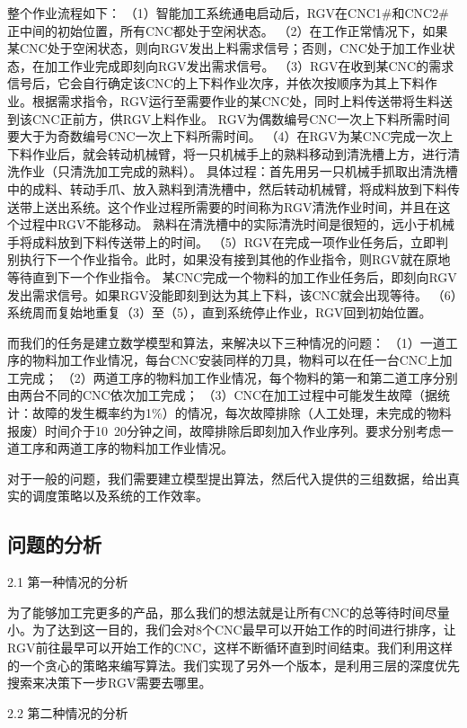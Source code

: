 \documentclass{cumcmthesis}
\begin{document}
整个作业流程如下：
（1）智能加工系统通电启动后，RGV在CNC1\#和CNC2\#正中间的初始位置，所有CNC都处于空闲状态。
（2）在工作正常情况下，如果某CNC处于空闲状态，则向RGV发出上料需求信号；否则，CNC处于加工作业状态，在加工作业完成即刻向RGV发出需求信号。
（3）RGV在收到某CNC的需求信号后，它会自行确定该CNC的上下料作业次序，并依次按顺序为其上下料作业。根据需求指令，RGV运行至需要作业的某CNC处，同时上料传送带将生料送到该CNC正前方，供RGV上料作业。
RGV为偶数编号CNC一次上下料所需时间要大于为奇数编号CNC一次上下料所需时间。
（4）在RGV为某CNC完成一次上下料作业后，就会转动机械臂，将一只机械手上的熟料移动到清洗槽上方，进行清洗作业（只清洗加工完成的熟料）。
具体过程：首先用另一只机械手抓取出清洗槽中的成料、转动手爪、放入熟料到清洗槽中，然后转动机械臂，将成料放到下料传送带上送出系统。这个作业过程所需要的时间称为RGV清洗作业时间，并且在这个过程中RGV不能移动。
熟料在清洗槽中的实际清洗时间是很短的，远小于机械手将成料放到下料传送带上的时间。
（5）RGV在完成一项作业任务后，立即判别执行下一个作业指令。此时，如果没有接到其他的作业指令，则RGV就在原地等待直到下一个作业指令。
某CNC完成一个物料的加工作业任务后，即刻向RGV发出需求信号。如果RGV没能即刻到达为其上下料，该CNC就会出现等待。
（6）系统周而复始地重复（3）至（5），直到系统停止作业，RGV回到初始位置。

而我们的任务是建立数学模型和算法，来解决以下三种情况的问题：
（1）一道工序的物料加工作业情况，每台CNC安装同样的刀具，物料可以在任一台CNC上加工完成；
（2）两道工序的物料加工作业情况，每个物料的第一和第二道工序分别由两台不同的CNC依次加工完成；
（3）CNC在加工过程中可能发生故障（据统计：故障的发生概率约为1\%）的情况，每次故障排除（人工处理，未完成的物料报废）时间介于10~20分钟之间，故障排除后即刻加入作业序列。要求分别考虑一道工序和两道工序的物料加工作业情况。

对于一般的问题，我们需要建立模型提出算法，然后代入提供的三组数据，给出真实的调度策略以及系统的工作效率。


\subsection{问题的分析}

2.1 第一种情况的分析

为了能够加工完更多的产品，那么我们的想法就是让所有CNC的总等待时间尽量小。为了达到这一目的，我们会对8个CNC最早可以开始工作的时间进行排序，让RGV前往最早可以开始工作的CNC，这样不断循环直到时间结束。我们利用这样的一个贪心的策略来编写算法。我们实现了另外一个版本，是利用三层的深度优先搜索来决策下一步RGV需要去哪里。

2.2 第二种情况的分析
\end{document}
